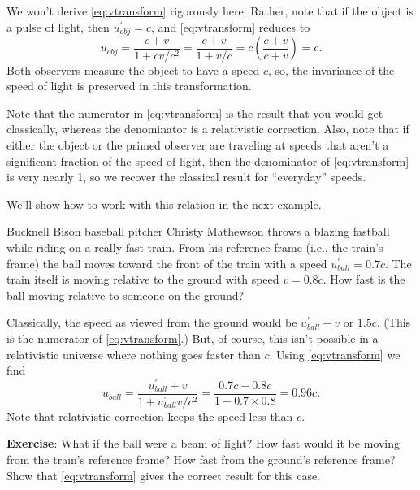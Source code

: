 We won't derive \eqref{eq:vtransform} rigorously here.  Rather,
note that if the object is a pulse of light, then $u_{ obj}^\prime
= c$, and \eqref{eq:vtransform} reduces to
\begin{equation}
u_{ obj} = \frac{c+v}{1 + cv/c^2} = \frac{c+v}{1+v/c} = 
c\left(\frac{c+v}{c+v}\right) = c.
\end{equation}
Both observers measure the object to have a speed $c$, so, the
invariance of the speed of light is preserved in this transformation.

Note that the numerator in \eqref{eq:vtransform} is the result
that you would get classically, whereas the denominator is a
relativistic correction. Also, note that if either the object or the
primed observer are traveling at speeds that aren't a significant
fraction of the speed of light, then the denominator of
\eqref{eq:vtransform} is very nearly 1, so we recover the
classical result for ``everyday'' speeds.
    
We'll show how to work with this relation in the next example.

\begin{example}
  Bucknell Bison baseball pitcher Christy Mathewson throws a blazing 
  fastball while riding on a really fast train.
  From his reference frame (i.e., the train's frame) the ball moves
  toward the front of the train with a speed $u_{ ball}^\prime = 0.7c$.
  The train itself is moving relative to the ground with speed $v =
  0.8c$.  How fast is the ball moving relative to someone on the
  ground?  



\solution Classically, the speed as viewed from the ground
  would be $u_{ ball}^\prime + v$ or $1.5c$.  (This is the numerator of
  \eqref{eq:vtransform}.)  But, of course, this isn't possible in
  a relativistic universe where nothing goes faster than $c$.  Using
  \eqref{eq:vtransform} we find
\begin{equation}
  u_{ ball} = \frac{u_{ ball}^\prime + v}{1+ u_{ ball}^\prime v/c^2}
  = \frac{0.7c + 0.8c}{1+0.7\times 0.8} = 0.96c.
\end{equation}
Note that relativistic correction keeps the speed less than $c$.

 \textbf{Exercise}: What if the ball were a beam of light?  How
fast would it be moving from the train's reference frame?  How fast
from the ground's reference frame?  Show that
\eqref{eq:vtransform} gives the correct result for this case.
\end{example}

